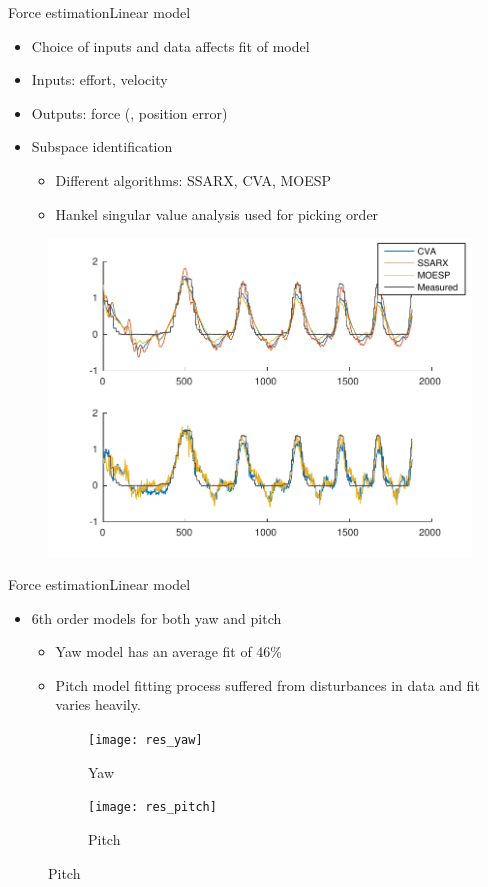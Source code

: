 \begin{frame}{Force estimation}{Linear model}
\begin{itemize}
  \item Choice of inputs and data affects fit of model
  \item Inputs: effort, velocity 
  \item Outputs: force (, position error)
  \item Subspace identification
	\begin{itemize}
	\item Different algorithms: SSARX, CVA, MOESP
	\item Hankel singular value analysis used for picking order
	\end{itemize}
\end{itemize}
	
	\begin{figure}
	\centering
	\includegraphics[width=\linewidth]{Billeder/sscomparison1-eps-converted-to.pdf}
	\end{figure}
\end{frame}

\begin{frame}{Force estimation}{Linear model}
\begin{itemize}
\item 6th order models for both yaw and pitch
\begin{itemize}
\item Yaw model has an average fit of 46\%
\item Pitch model fitting process suffered from disturbances in data and fit varies heavily.
\end{itemize}
\end{itemize}
\begin{figure}
\centering
    \begin{subfigure}[t]{0.49\textwidth}
        \centering
        \texttt{[image: res\_yaw]} 
        \caption{Yaw} \label{fig:yawres}
    \end{subfigure}
        \begin{subfigure}[t]{0.49\textwidth}
        \centering
        \texttt{[image: res\_pitch]} 
        \caption{Pitch} \label{fig:pitchres}
    \end{subfigure}
\end{figure}
\end{frame}

